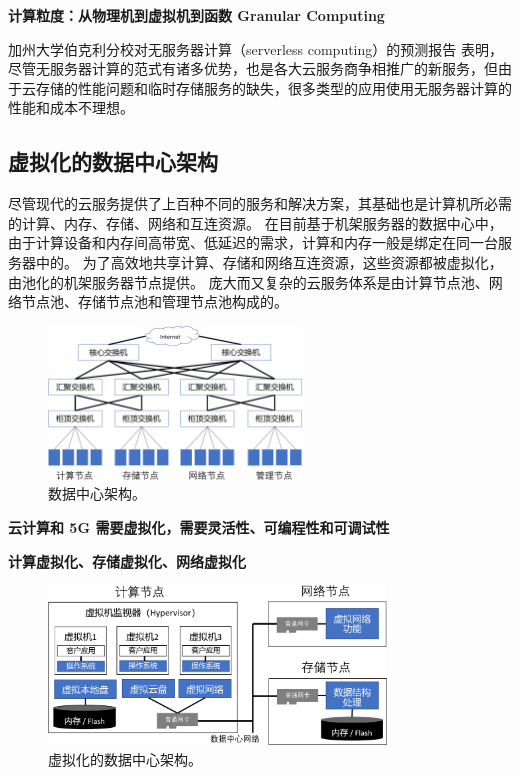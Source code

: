 \textbf{计算粒度：从物理机到虚拟机到函数 Granular Computing}

加州大学伯克利分校对无服务器计算（serverless computing）的预测报告 \cite{jonas2019cloud} 表明，尽管无服务器计算的范式有诸多优势，也是各大云服务商争相推广的新服务，但由于云存储的性能问题和临时存储服务的缺失，很多类型的应用使用无服务器计算的性能和成本不理想。


\subsection{虚拟化的数据中心架构}

尽管现代的云服务提供了上百种不同的服务和解决方案，其基础也是计算机所必需的计算、内存、存储、网络和互连资源。
在目前基于机架服务器的数据中心中，由于计算设备和内存间高带宽、低延迟的需求，计算和内存一般是绑定在同一台服务器中的。
为了高效地共享计算、存储和网络互连资源，这些资源都被虚拟化，由池化的机架服务器节点提供。
庞大而又复杂的云服务体系是由计算节点池、网络节点池、存储节点池和管理节点池构成的。

\begin{figure}[htbp]
	\centering
	\includegraphics[width=0.6\textwidth]{figures/DC_arch.pdf}
	\caption{数据中心架构。}
	\label{background:fig:cloud-architecture}
\end{figure}


\textbf{云计算和 5G 需要虚拟化，需要灵活性、可编程性和可调试性}

\textbf{计算虚拟化、存储虚拟化、网络虚拟化}


\begin{figure}[htbp]
	\centering
	\includegraphics[width=0.8\textwidth]{figures/virt_arch.pdf}
	\caption{虚拟化的数据中心架构。}
	\label{background:fig:virt-architecture}
\end{figure}


